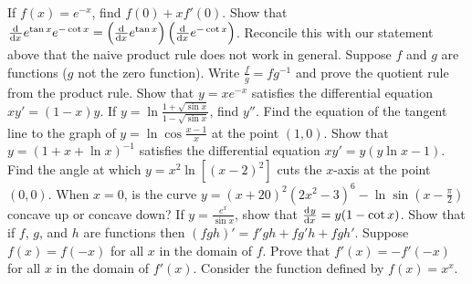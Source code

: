 \begin{questions}
\begin{multicols}{2}
    \end{multicols}
  \questioA If $ f(x) = e^{-x} $, find $ f(0) + xf'(0) $.
  \questioM Show that $ \od{}{x} e^{\tan x} e^{-\cot x} = \left(\od{}{x}e^{\tan x}\right)\left(\od{}{x}e^{-\cot x}\right) $. Reconcile
            this with our statement above that the naive product rule does not work in general.
  \questioM Suppose $ f $ and $ g $ are functions ($ g $ not the zero function). Write $ \frac{f}{g} = fg^{-1} $ and
            prove the quotient rule from the product rule.
  \questioM Show that $ y = xe^{-x} $ satisfies the differential equation $ xy' = (1-x)y $.
  \questioM If $ y = \ln \frac{1 + \sqrt{\sin x}}{1 - \sqrt{\sin x}} $, find $ y'' $.
  \questioM Find the equation of the tangent line to the graph of $ y = \ln \cos \frac{x - 1}{x} $ at
            the point $(1, 0)$.
  \questioM Show that $ y = (1 + x + \ln x)^{-1} $ satisfies the differential equation $ xy' = y(y \ln x - 1) $.
  \questioE Find the angle at which $ y = x^2 \ln [(x - 2)^2] $ cuts the $ x$-axis at the point $ (0,0) $.
  \questioM When $ x = 0 $, is the curve $ y = (x + 20)^2 (2x^2 - 3)^6 - \ln \sin (x - \frac{\pi}{2}) $ concave up or concave down?
  \questioM If $ y = \frac{e^x}{\sin x} $, show that $ \od{y}{x} = y(1 - \cot x) $.
  \questioM Show that if $ f $, $ g $, and $ h $ are functions then $ (fgh)' = f'gh + fg'h + fgh' $.
  \questioE Suppose $ f(x) = f(-x) $ for all $ x $ in the domain of $ f $. Prove that $ f'(x) = -f'(-x) $ for all $ x $
            in the domain of $ f'(x) $.
  \questioE Consider the function defined by $ f(x) = x^x $.
\end{questions}
